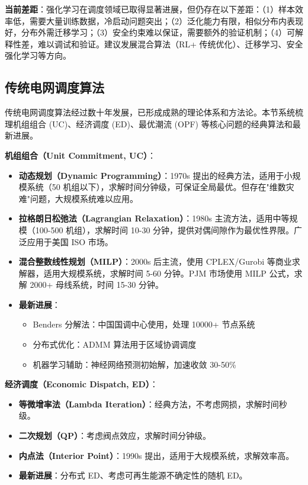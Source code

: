 \documentclass[12pt,a4paper]{article}
\begin{document}
\textbf{当前差距}：强化学习在调度领域已取得显著进展，但仍存在以下差距：（1）样本效率低，需要大量训练数据，冷启动问题突出；（2）泛化能力有限，相似分布内表现好，分布外需迁移学习；（3）安全约束难以保证，需要额外的验证机制；（4）可解释性差，难以调试和验证。建议发展混合算法（RL+ 传统优化）、迁移学习、安全强化学习等方向。

\subsection{传统电网调度算法}

传统电网调度算法经过数十年发展，已形成成熟的理论体系和方法论。本节系统梳理机组组合 (UC)、经济调度 (ED)、最优潮流 (OPF) 等核心问题的经典算法和最新进展。

\textbf{机组组合（Unit Commitment, UC）}：

\begin{itemize}
    \item \textbf{动态规划（Dynamic Programming）}：1970s 提出的经典方法，适用于小规模系统（50 机组以下），求解时间分钟级，可保证全局最优。但存在"维数灾难"问题，大规模系统难以应用。
    
    \item \textbf{拉格朗日松弛法（Lagrangian Relaxation）}：1980s 主流方法，适用中等规模（100-500 机组），求解时间 10-30 分钟，提供对偶间隙作为最优性界限。广泛应用于美国 ISO 市场。
    
    \item \textbf{混合整数线性规划（MILP）}：2000s 后主流，使用 CPLEX/Gurobi 等商业求解器，适用大规模系统，求解时间 5-60 分钟。PJM 市场使用 MILP 公式，求解 2000+ 母线系统，时间 15-30 分钟\cite{wang2015security}。
    
    \item \textbf{最新进展}：
    \begin{itemize}
        \item Benders 分解法：中国国调中心使用，处理 10000+ 节点系统
        \item 分布式优化：ADMM 算法用于区域协调调度
        \item 机器学习辅助：神经网络预测初始解，加速收敛 30-50\%
    \end{itemize}
\end{itemize}

\textbf{经济调度（Economic Dispatch, ED）}：

\begin{itemize}
    \item \textbf{等微增率法（Lambda Iteration）}：经典方法，不考虑网损，求解时间秒级。
    
    \item \textbf{二次规划（QP）}：考虑阀点效应，求解时间分钟级。
    
    \item \textbf{内点法（Interior Point）}：1990s 提出，适用于大规模系统，求解效率高。
    
    \item \textbf{最新进展}：分布式 ED、考虑可再生能源不确定性的随机 ED\cite{zhang2020economic}。
\end{itemize}
\end{document}
